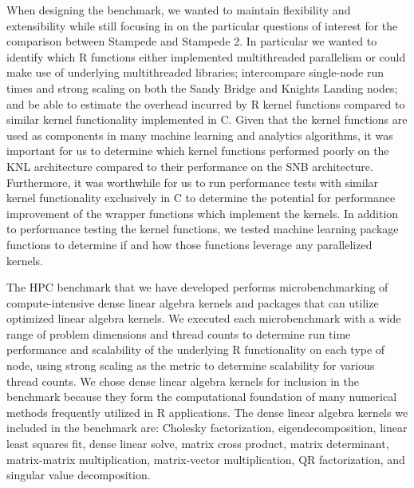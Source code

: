 When designing the benchmark, we wanted to maintain flexibility and extensibility while
still focusing in on the particular questions of interest for the comparison between
Stampede and Stampede 2. In particular we wanted to identify which R functions either
implemented multithreaded parallelism or could make use of underlying multithreaded
libraries; intercompare single-node run times and strong scaling on both the Sandy Bridge
and Knights Landing nodes; and be able to estimate the overhead incurred by R kernel
functions compared to similar kernel functionality implemented in C. Given that the kernel
functions are used as components in many machine learning and analytics algorithms, it was
important for us to determine which kernel functions performed poorly on the KNL
architecture compared to their performance on the SNB architecture. Furthermore, it was
worthwhile for us to run performance tests with similar kernel functionality exclusively
in C to determine the potential for performance improvement of the wrapper functions which
implement the kernels. In addition to performance testing the kernel functions, we tested
machine learning package functions to determine if and how those functions leverage any
parallelized kernels.

The HPC benchmark that we have developed performs microbenchmarking of compute-intensive
dense linear algebra kernels and packages that can utilize optimized linear algebra
kernels. We executed each microbenchmark with a wide range of problem dimensions and
thread counts to determine run time performance and scalability of the underlying R
functionality on each type of node, using strong scaling as the metric to determine
scalability for various thread counts.
We chose dense linear algebra kernels for inclusion in the benchmark because they form the
computational foundation of many numerical methods frequently utilized in R applications.
The dense linear algebra kernels we included in the benchmark are: Cholesky factorization,
eigendecomposition, linear least squares fit, dense linear solve, matrix cross product,
matrix determinant, matrix-matrix multiplication, matrix-vector multiplication, QR
factorization, and singular value decomposition.


